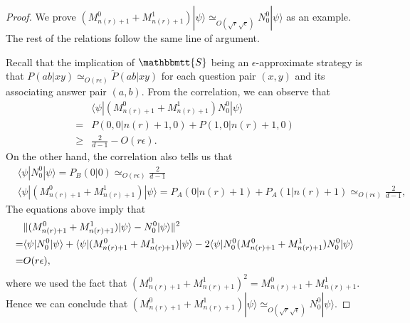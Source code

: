\documentclass[11pt,letterpaper]{article}
\newcommand{\ket}[1]{|#1\rangle}
\newcommand{\bra}[1]{\langle#1|}
\DeclarePairedDelimiter{\norm}{\lVert}{\rVert}
\newcommand{\1}{\mathbb{1}}
\newcommand{\nr}{n(r)}
\newcommand{\bS}{\mathbbmtt{S}}
\newcommand{\pr}[2]{P(#1|#2)}
\newcommand{\pa}[2]{P_A(#1|#2)}
\newcommand{\pb}[2]{P_B(#1|#2)}
\newcommand{\tpr}[2]{\tilde{P}(#1|#2)}
\newcommand{\ep}{\epsilon}
\newcommand{\se}{\sqrt{\epsilon}}
\newcommand{\sr}{\sqrt{r}}
\newcommand{\appd}[1]{\simeq_{#1}}
\theoremstyle{definition}
\begin{document}
\begin{proof} 
We prove $(M_{\nr+1}^0+M_{\nr+1}^1)\ket{\psi} \appd{O(\sr \se)} N_0^0 \ket{\psi}$ as an example.
The rest of the relations follow the same line of argument.

Recall that the implication of $\bS$ being an $\ep$-approximate strategy is that 
$\pr{ab}{xy} \appd{O(r \ep)} \tpr{ab}{xy}$ for each question 
pair $(x,y)$ and its associating answer pair $(a,b)$.
From the correlation, we can observe that
\begin{align*}
 &\bra{\psi} (M_{\nr+1}^0+M_{\nr+1}^1)N_0^0 \ket{\psi} \\
 = &\pr{0,0}{\nr+1,0} + \pr{1,0}{\nr+1,0}\\
 \geq &\frac{2}{d-1} - O(r \ep).
\end{align*}
On the other hand, the correlation also tells us that 
\begin{align*}
	&\bra{\psi} N_0^0 \ket{\psi} = \pb{0}{0} \appd{O(r\ep)} \frac{2}{d-1}\\
 &\bra{\psi}(M_{\nr+1}^0+M_{\nr+1}^1)\ket{\psi} 
 = \pa{0}{\nr+1} + \pa{1}{\nr+1}
 \appd{O(r\ep)} \frac{2}{d-1},
\end{align*}
The equations above imply that 
\begin{align*}
	&\norm{(M_{\nr+1}^0 + M_{\nr+1}^1) \ket{\psi} - N_0^0 \ket{\psi}}^2 \\
	= &\bra{\psi} N_0^0 \ket{\psi}+\bra{\psi}(M_{\nr+1}^0+M_{\nr+1}^1)\ket{\psi} - 2\bra{\psi}N_0^0(M_{\nr+1}^0 + M_{\nr+1}^1)N_0^0 \ket{\psi}\\
	= &O(r \ep),
\end{align*}
where we used the fact that $(M_{\nr+1}^0 + M_{\nr+1}^1)^2 = M_{\nr+1}^0 + M_{\nr+1}^1$.
Hence we can conclude that $(M_{\nr+1}^0 + M_{\nr+1}^1)\ket{\psi} \appd{O(\sr \se)} N_0^0\ket{\psi}$.
\end{proof}
\end{document}
